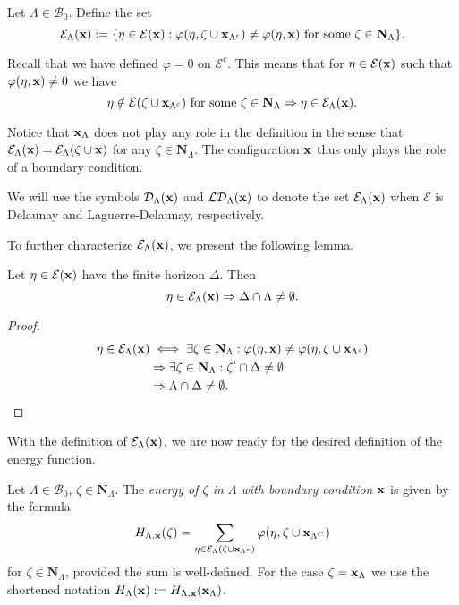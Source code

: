 \begin{definition}\label{def:Eset} Let $\Lambda \in \mathcal B_0$. Define the set 
	$$\mathcal E_\Lambda({\mathbf{x}}) := \{ \eta \in \mathcal E({\mathbf{x}}): \varphi(\eta,\zeta \cup {\mathbf{x}}_{\Lambda^c}) \neq \varphi(\eta,{\mathbf{x}}) \text{ for some } \zeta \in \mathbf N_\Lambda \}.$$
\end{definition}

Recall that we have defined $\varphi=0$ on $\mathcal E^c$. This means that for $\eta \in \mathcal E({\mathbf{x}})$ such that $\varphi(\eta,{\mathbf{x}})\neq 0$ we have
$$\eta \notin \mathcal E(\zeta \cup {\mathbf{x}}_{\Lambda^c})\text{ for some }\zeta \in \mathbf N_{\Lambda} \Rightarrow \eta \in \mathcal E_{\Lambda}({\mathbf{x}}).$$ 

Notice that ${\mathbf{x}}_\Lambda$ does not play any role in the definition in the sense that $\mathcal E_\Lambda({\mathbf{x}})=\mathcal E_\Lambda(\zeta \cup {\mathbf{x}})$ for any $\zeta \in \mathbf N_\Lambda$. The configuration ${\mathbf{x}}$ thus only plays the role of a boundary condition.

We will use the symbols $\mathcal D_\Lambda({\mathbf{x}})$ and $\mathcal {LD}_\Lambda({\mathbf{x}})$ to denote the set $\mathcal E_\Lambda({\mathbf{x}})$ when $\mathcal E$ is Delaunay and Laguerre-Delaunay, respectively.

To further characterize $\mathcal E_\Lambda({\mathbf{x}})$, we present the following lemma.
\begin{lemma}\label{lemma:horizEset}Let $\eta \in \mathcal E({\mathbf{x}})$ have the finite horizon $\Delta$. Then
	$$\eta \in \mathcal E_\Lambda({\mathbf{x}}) \Rightarrow \Delta \cap \Lambda \neq \emptyset.$$
\end{lemma}
\begin{proof}
	\begin{align*}
		\eta \in \mathcal E_\Lambda({\mathbf{x}}) & \iff \exists \zeta \in \mathbf N_\Lambda: \varphi(\eta,{\mathbf{x}}) \neq \varphi(\eta,\zeta \cup {\mathbf{x}}_{\Lambda^c}) \\
			& \Rightarrow \exists \zeta \in \mathbf N_\Lambda: \zeta' \cap \Delta \neq \emptyset \\
			& \Rightarrow \Lambda \cap \Delta \neq \emptyset.
	\end{align*}
\end{proof}

With the definition of $\mathcal E_\Lambda({\mathbf{x}})$, we are now ready for the desired definition of the energy function.

\begin{definition}\label{def:energy}
	Let $\Lambda \in \mathcal B_0$, $\zeta \in \mathbf N_\Lambda$. The \textit{energy of $\zeta$ in $\Lambda$ with boundary condition ${\mathbf{x}}$} is given by the formula
$$H_{\Lambda,{\mathbf{x}}}(\zeta) = \sum_{\eta \in \mathcal E_\Lambda(\zeta \cup {\mathbf{x}}_{\Lambda^c})} \varphi(\eta, \zeta \cup {\mathbf{x}}_{\Lambda^C})$$
for $\zeta \in \mathbf N_{\Lambda}$, provided the sum is well-defined. \newline
For the case $\zeta = {\mathbf{x}}_\Lambda$ we use the shortened notation $H_\Lambda({\mathbf{x}}):=H_{\Lambda,{\mathbf{x}}}({\mathbf{x}}_\Lambda)$.
\end{definition}


